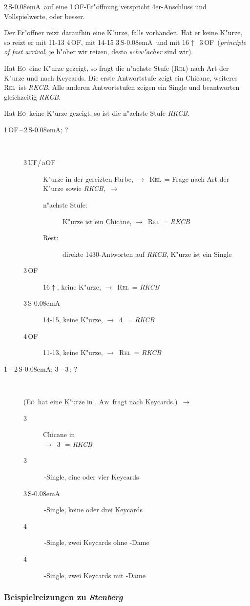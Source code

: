 \documentclass[11pt,german,twocolumn]{scrartcl}
\renewcommand{\Cl}{{\color{ClColor}{$\clubsuit$}}}
\renewcommand{\Di}{{\color{DiColor}{$\vardiamondsuit$}}}
\renewcommand{\He}{{\color{HeColor}{$\varheartsuit$}}}
\renewcommand{\Sp}{{\color{SpColor}{$\spadesuit$}}}
\def\pik{\,\Sp}
\def\coe{\,\He}
\def\kar{\,\Di}
\def\tre{\,\Cl}
\def\co{\He}
\def\tr{\Cl}
\def\ra{$\rightarrow$}
\def\pl{$\uparrow$}
\def\uf{\textsf{\,UF}}
\def\of{\textsf{\,OF}}
\def\aof{\textsf{\,aOF}}
\def\SA{\textsf{\,S\kern-0.08emA}}
\def\sep{\,--\,}
\newcommand{\conv}[1]{\emph{#1}}
\def\rel{\textsc{Rel}}
\def\aw{\textsc{Aw}}
\def\eo{\textsc{E\"o}}
\def\bdsc{\begin{description}}
\def\edsc{\end{description}}
\begin{document}
2\SA\ auf eine 1\of-Er"offnung verspricht 4er-Anschluss und
Vollspielwerte, oder besser.

Der Er"offner reizt daraufhin eine K"urze, falls vorhanden. Hat er
keine K"urze, so reizt er mit 11-13 4\of, mit 14-15 3\SA\ und mit
16\pl\ 3\of\ (\conv{principle of fast arrival}, je h"oher wir reizen,
desto \emph{schw"acher} sind wir).

Hat \eo\ eine K"urze gezeigt, so fragt die n"achste Stufe (\rel) nach
Art der K"urze und nach Keycards.  Die erste Antwortstufe zeigt ein
Chicane, weiteres \rel\ ist \conv{RKCB}.  Alle anderen Antwortstufen
zeigen ein Single und beantworten gleichzeitig \conv{RKCB}.

Hat \eo\ keine K"urze gezeigt, so ist die n"achste Stufe \conv{RKCB}.

\bdsc
\item[1\of\sep2\SA; ?]~
  \bdsc
  \item[3\uf/\aof] K"urze in der gereizten Farbe, \ra~\rel\ = Frage
    nach Art der K"urze sowie \conv{RKCB},~\ra
    \bdsc
    \item[n"achste Stufe:] K"urze ist ein Chicane, \ra~\rel\ = \conv{RKCB}
    \item[Rest:] direkte 1430-Antworten auf
      \conv{RKCB}, K"urze ist ein Single
    \edsc
  \item[3\of] 16\pl, keine K"urze, \ra~\rel\ = \conv{RKCB}
  \item[3\SA] 14-15, keine K"urze, \ra~4\tre\ = \conv{RKCB}
  \item[4\of] 11-13, keine K"urze, \ra~\rel\ = \conv{RKCB}
  \edsc
\item[1\coe\sep2\SA; 3\tre\sep3\kar; ?]~
  
  (\eo\ hat eine K"urze in \tr, \aw\ fragt nach Keycards.)~\ra
  \bdsc
  \item[3\coe] Chicane in \tre\\
    \ra~3\pik\ = \conv{RKCB}
  \item[3\pik] \tre-Single, eine oder vier Keycards
  \item[3\SA] \tre-Single, keine oder drei Keycards
  \item[4\tre] \tre-Single, zwei Keycards ohne \co-Dame
  \item[4\kar] \tre-Single, zwei Keycards mit \co-Dame
  \edsc
\edsc

\subsubsection{Beispielreizungen zu \conv{Stenberg}}
\end{document}
